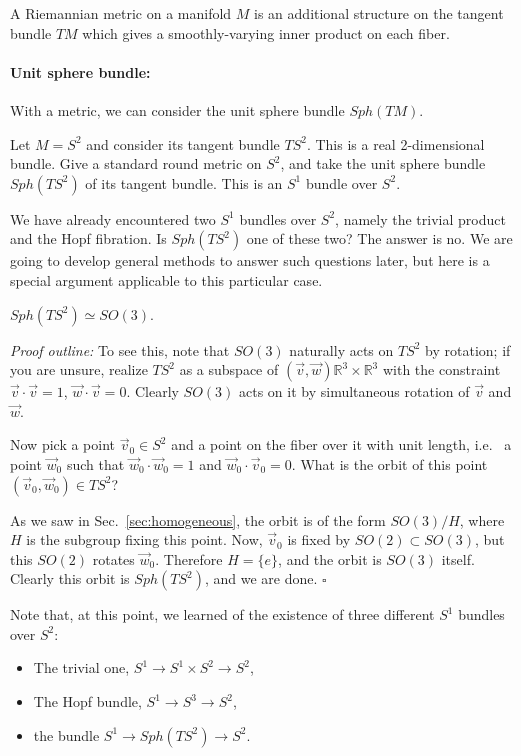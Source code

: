 \documentclass[12pt]{article}
\numberwithin{equation}{section}
\theoremstyle{remark}
\renewenvironment{proof}{\noindent\textsl{Proof outline:}}{\hfill$\square$}
\def\bR{\mathbb{R}}
\begin{document}
\begin{definition}
A Riemannian metric on a manifold $M$
is an additional structure on the tangent bundle $TM$
which gives a smoothly-varying inner product 
on each fiber.
\end{definition}

\paragraph{Unit sphere bundle:}
With a metric, we can consider the unit sphere bundle $Sph(TM)$.

\begin{example}
Let $M=S^2$ and consider its tangent bundle $TS^2$.
This is a real 2-dimensional bundle.
Give a standard round metric on $S^2$,
and take the unit sphere bundle $Sph(TS^2)$ of its tangent bundle.
This is an $S^1$ bundle over $S^2$.
\end{example}
We have already encountered two $S^1$ bundles over $S^2$,
namely the trivial product and the Hopf fibration.
Is $Sph(TS^2)$ one of these two?
The answer is no.
We are going to develop general methods to answer such questions later,
but here is a special argument applicable to this particular case.
\begin{example}
$Sph(TS^2) \simeq SO(3)$.
\end{example}

\begin{proof}
To see this, note that $SO(3)$ naturally acts on $TS^2$ by rotation;
if you are unsure, realize $TS^2$ as a subspace of $(\vec v,\vec w) \bR^3\times \bR^3$
with the constraint $\vec v\cdot \vec v=1$, $\vec w\cdot \vec v=0$.
Clearly $SO(3)$ acts on it by simultaneous rotation of $\vec v$ and $\vec w$.

Now pick a point $\vec v_0 \in S^2$ and a point on the fiber over it with unit length, 
i.e.~ a point $\vec w_0$ such that $\vec w_0\cdot \vec w_0=1$ and $\vec w_0\cdot \vec v_0 =0$.
What is the orbit of this point $(\vec v_0,\vec w_0)\in TS^2$?

As we saw in Sec.~\ref{sec:homogeneous}, the orbit is of the form $SO(3)/H$, where $H$ is the subgroup fixing this point.
Now, $\vec v_0$ is fixed by $SO(2)\subset SO(3)$, but this $SO(2)$ rotates $\vec w_0$.
Therefore $H=\{e\}$, and the orbit is $SO(3)$ itself.
Clearly this orbit is $Sph(TS^2)$, and we are done.
\end{proof}

Note that, at this point, we learned of the existence of three different $S^1$ bundles over $S^2$:
\begin{itemize}
\item The trivial one, $S^1\to S^1\times S^2\to S^2$,
\item The Hopf bundle, $S^1\to S^3\to S^2$,
\item the bundle $S^1\to Sph(TS^2)\to S^2$.
\end{itemize}
\end{document}
